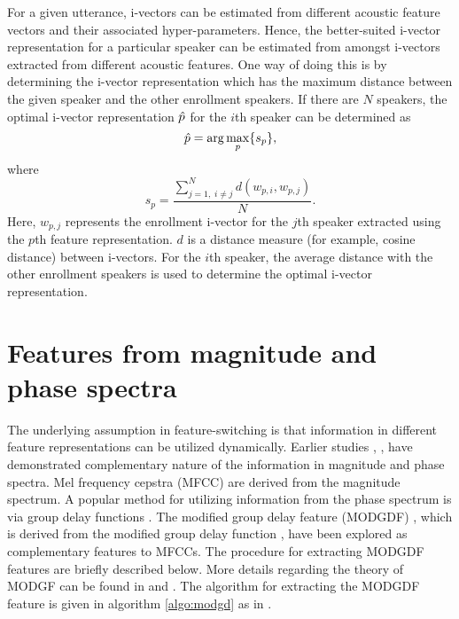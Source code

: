 \documentclass[preprint,12pt,5p]{elsarticle}
\begin{document}
For a given utterance, i-vectors can be estimated from different acoustic
feature vectors and their associated hyper-parameters. Hence, the
better-suited i-vector representation for a particular speaker can be estimated
from amongst i-vectors extracted from different acoustic features. One way of
doing this is by determining the i-vector representation which has the maximum
distance between the given speaker and the other enrollment speakers. If there
are $N$ speakers, the optimal i-vector representation $\Hat{p}$ 
for the $i$th speaker can be determined as
\begin{equation}
\Hat{p} = \arg\max_p \{s_p\},
\label{eq:opt_ivec}
\end{equation}
where 
\begin{equation}
s_p = \frac{\displaystyle \sum_{j=1, \; i \neq j}^N d(w_{p,i},w_{p,j})}{N}.
\label{eq:sp}
\end{equation}
Here, $w_{p,j}$ represents the enrollment i-vector for the $j$th speaker
extracted using the $p$th feature representation. $d$ is a distance measure (for
example, cosine distance) between i-vectors. For the $i$th speaker, the average
distance with the other enrollment speakers is used to determine the optimal
i-vector representation. 

\section{Features from magnitude and phase spectra}
\label{sec:featExt}

The underlying assumption in feature-switching is that information in different
feature representations can be utilized dynamically. Earlier studies
\cite{complement1}, \cite{complement2}, \cite{complement3} have demonstrated
complementary nature of the information in magnitude and phase spectra. Mel frequency cepstra
(MFCC) are derived from the magnitude spectrum. A popular method for utilizing
information from the phase spectrum is via group delay functions
\cite{group_delay}. The modified group delay feature (MODGDF) \cite{modgd_feat},
which is derived from the modified group delay function \cite{modgd_func}, have
been explored as complementary features to MFCCs. The procedure for extracting
MODGDF features are briefly described below. More details regarding the theory
of MODGF can be found in \cite{modgd_func} and \cite{modgd_feat}. The algorithm
for extracting the MODGDF feature is given in algorithm \ref{algo:modgd} as 
in \cite{hegdeModgdf}.
\end{document}
